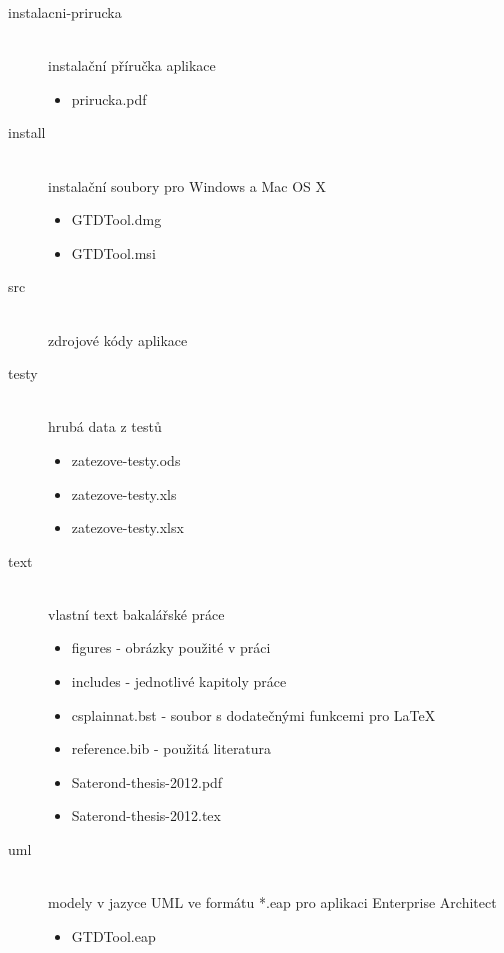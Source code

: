 \documentclass[11pt,twoside,a4paper]{book}
\begin{document}
\begin{description}
\item[instalacni-prirucka] \hfill \\
	instalační příručka aplikace
	\begin{itemize}
	\item prirucka.pdf
	\end{itemize}
\item[install] \hfill \\
	instalační soubory pro Windows a Mac OS X
	\begin{itemize}
	\item GTDTool.dmg
	\item GTDTool.msi
	\end{itemize}
\item[src] \hfill \\
	zdrojové kódy aplikace
\item[testy] \hfill \\
	hrubá data z testů
	\begin{itemize}
	\item zatezove-testy.ods
	\item zatezove-testy.xls
	\item zatezove-testy.xlsx	
	\end{itemize}
\item[text] \hfill \\
	vlastní text bakalářské práce
	\begin{itemize}
	\item figures - obrázky použité v práci
	\item includes - jednotlivé kapitoly práce
	\item csplainnat.bst - soubor s dodatečnými funkcemi pro {\LaTeX}
	\item reference.bib - použitá literatura
	\item Saterond-thesis-2012.pdf
	\item Saterond-thesis-2012.tex
	\end{itemize}
\item[uml] \hfill \\
	modely v jazyce UML ve formátu *.eap pro aplikaci Enterprise Architect
	\begin{itemize}
	\item GTDTool.eap
	\end{itemize}
\end{description}
\end{document}
